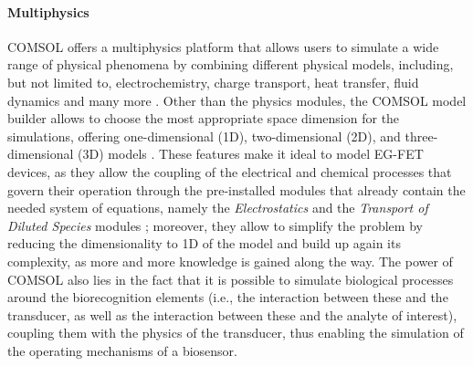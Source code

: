 \paragraph{Multiphysics}
COMSOL offers a multiphysics platform that allows users to simulate a wide range of physical phenomena by combining different physical models, including, but not limited to, electrochemistry, charge transport, heat transfer, fluid dynamics and many more \citep{comsolCOMSOL_manual}. Other than the physics modules, the COMSOL model builder allows to choose the most appropriate space dimension for the simulations, offering one-dimensional (1D), two-dimensional (2D), and three-dimensional (3D) models \citep{comsolCOMSOL_manual}. These features make it ideal to model EG-FET devices, as they allow the coupling of the electrical and chemical processes that govern their operation through the pre-installed modules that already contain the needed system of equations, namely the \emph{Electrostatics} and the \emph{Transport of Diluted Species} modules \citep{delavariNernst2021}; moreover, they allow to simplify the problem by reducing the dimensionality to 1D of the model and build up again its complexity, as more and more knowledge is gained along the way. The power of COMSOL also lies in the fact that it is possible to simulate biological processes around the biorecognition elements (i.e., the interaction between these and the transducer, as well as the interaction between these and the analyte of interest), coupling them with the physics of the transducer, thus enabling the simulation of the operating mechanisms of a biosensor.

